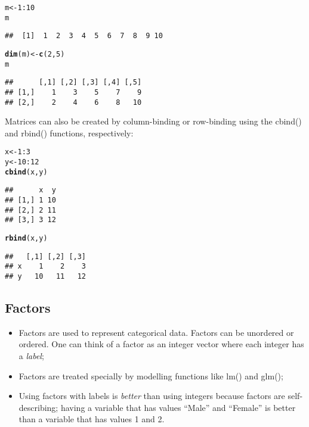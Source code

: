 \documentclass[10pt,a4paper,twoside]{article}\usepackage[]{graphicx}\usepackage[]{xcolor}
\makeatletter
\newcommand{\hlnum}[1]{\textcolor[rgb]{0.686,0.059,0.569}{#1}}%
\newcommand{\hlopt}[1]{\textcolor[rgb]{0,0,0}{#1}}%
\newcommand{\hldef}[1]{\textcolor[rgb]{0.345,0.345,0.345}{#1}}%
\newcommand{\hlkwb}[1]{\textcolor[rgb]{0.69,0.353,0.396}{#1}}%
\newcommand{\hlkwd}[1]{\textcolor[rgb]{0.737,0.353,0.396}{\textbf{#1}}}%
\newenvironment{kframe}{%
 \def\at@end@of@kframe{}%
 \ifinner\ifhmode%
  \def\at@end@of@kframe{\end{minipage}}%
  \begin{minipage}{\columnwidth}%
 \fi\fi%
 \def\FrameCommand##1{\hskip\@totalleftmargin \hskip-\fboxsep
 \colorbox{shadecolor}{##1}\hskip-\fboxsep
     \hskip-\linewidth \hskip-\@totalleftmargin \hskip\columnwidth}%
 \MakeFramed {\advance\hsize-\width
   \@totalleftmargin\z@ \linewidth\hsize
   \@setminipage}}%
 {\par\unskip\endMakeFramed%
 \at@end@of@kframe}
\newenvironment{knitrout}{}{} %
\makeatother
\begin{document}
\begin{knitrout}
\color{fgcolor}\begin{kframe}
\begin{alltt}
\hldef{m} \hlkwb{<-} \hlnum{1}\hlopt{:}\hlnum{10}
\hldef{m}
\end{alltt}
\begin{verbatim}
##  [1]  1  2  3  4  5  6  7  8  9 10
\end{verbatim}
\begin{alltt}
\hlkwd{dim}\hldef{(m)} \hlkwb{<-} \hlkwd{c}\hldef{(}\hlnum{2}\hldef{,} \hlnum{5}\hldef{)}
\hldef{m}
\end{alltt}
\begin{verbatim}
##      [,1] [,2] [,3] [,4] [,5]
## [1,]    1    3    5    7    9
## [2,]    2    4    6    8   10
\end{verbatim}
\end{kframe}
\end{knitrout}

Matrices can also be created by column-binding or row-binding using the cbind() and rbind() functions, respectively:

\begin{knitrout}
\color{fgcolor}\begin{kframe}
\begin{alltt}
\hldef{x} \hlkwb{<-} \hlnum{1}\hlopt{:}\hlnum{3}
\hldef{y} \hlkwb{<-} \hlnum{10}\hlopt{:}\hlnum{12}
\hlkwd{cbind}\hldef{(x, y)}
\end{alltt}
\begin{verbatim}
##      x  y
## [1,] 1 10
## [2,] 2 11
## [3,] 3 12
\end{verbatim}
\begin{alltt}
\hlkwd{rbind}\hldef{(x,y)}
\end{alltt}
\begin{verbatim}
##   [,1] [,2] [,3]
## x    1    2    3
## y   10   11   12
\end{verbatim}
\end{kframe}
\end{knitrout}

\subsection{Factors}

\begin{itemize}
  \item Factors are used to represent categorical data. Factors can be unordered or ordered. One can think of a factor as an integer vector where each integer has a \emph{label};
  \item Factors are treated specially by modelling functions like lm() and glm();
  \item Using factors with labels is \emph{better} than using integers because factors are self-describing; having a variable that has values ``Male'' and ``Female'' is better than a variable that has values 1 and 2.
\end{itemize}
\end{document}
